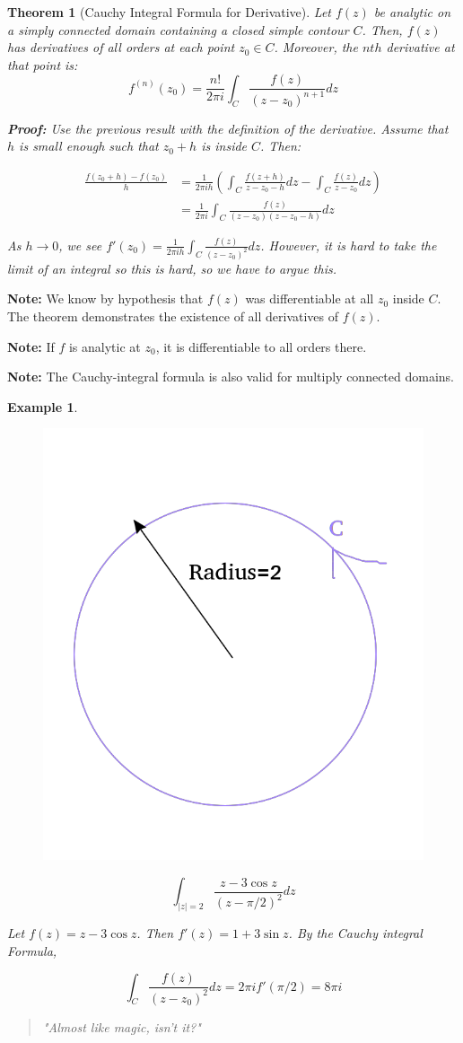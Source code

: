 \documentclass{article}
\newtheorem{theorem}{Theorem}[section]
\newtheorem{ex}{Example}
\theoremstyle{definition}
\begin{document}
\begin{theorem}[Cauchy Integral Formula for Derivative]
Let $f(z)$ be analytic on a simply connected domain containing a closed simple contour $C$. Then, $f(z)$ has derivatives of all orders at each point $z_0 \in C$. Moreover, the $nth$ derivative at that point is:
$$f^{(n)}(z_0) = \frac{n!}{2\pi i } \int_C \frac{f(z)}{(z-z_0)^{n+1}}dz$$

\textbf{Proof:}
Use the previous result with the definition of the derivative. Assume that $h$ is small enough such that $z_0+h$ is inside $C$. Then:

\begin{align}
\frac{f(z_0+h) - f(z_0)}{h}& = \frac{1}{2\pi i h } \left(\int_C \frac{f(z+h)}{z-z_0-h} dz - \int_C \frac{f(z)}{z-z_0}dz \right)\\
&= \frac{1}{2\pi i } \int_C \frac{f(z)}{(z-z_0)(z-z_0-h)} dz
\end{align}

As $h \to 0$, we see $f'(z_0) = \frac{1}{2\pi i h } \int_C \frac{f(z)}{(z-z_0)^2} dz$. However, it is hard to take the limit of an integral so this is hard, so we have to argue this.
\end{theorem}

\textbf{Note:} We know by hypothesis that $f(z)$ was differentiable at all $z_0$ inside $C$. The theorem demonstrates the existence of all derivatives of $f(z)$. 

\textbf{Note:} If $f$ is analytic at $z_0$, it is differentiable to all orders there. 

\textbf{Note:} The Cauchy-integral formula is also valid for multiply connected domains.

\begin{ex}
\begin{figure}[H]
	\centering
	\includegraphics[width=0.4\linewidth]{example12}
	\caption{}
	\label{fig:example12}
\end{figure}


$$\int_{|z|=2}\frac{z-3\cos z}{(z-\pi/2)^2}dz$$

Let $f(z) = z-3\cos z$. Then $f'(z) = 1+3 \sin z$. By the Cauchy integral Formula, 

$$\int_{C} \frac{f(z)}{(z-z_0)^2} dz = 2\pi i f'(\pi/2) = 8\pi i $$
\begin{quote}
	"Almost like magic, isn't it?"
\end{quote}
\end{ex}
\end{document}
